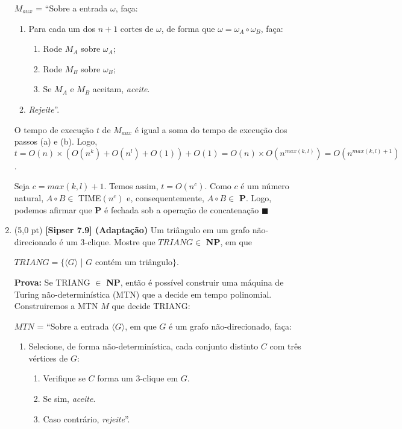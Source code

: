 \documentclass[12pt,a4paper,oneside]{article}
\begin{document}
\begin{enumerate}
{		$M_{aux}$ = ``Sobre a entrada $\omega$, faça:
		\begin{enumerate}
			\item Para cada um dos $n+1$ cortes de $\omega$, de forma que $\omega = \omega_A \circ \omega_B$, faça:
			\begin{enumerate}
				\item Rode $M_A$ sobre $\omega_A$;
				\item Rode $M_B$ sobre $\omega_B$;
				\item Se $M_A$ e $M_B$ aceitam, {\it aceite}.
			\end{enumerate}
			\item {\it Rejeite}''.
		\end{enumerate}
		
		O tempo de execução $t$ de $M_{aux}$ é igual a soma do tempo de execução dos passos (a) e (b). Logo, $t = O(n) \times (O(n^k) + O(n^l) + O(1)) + O(1) = O(n) \times O(n^{max(k,l)}) = O(n^{max(k,l) + 1})$. 
		
		Seja  $c = max(k,l) + 1$. Temos assim, $t = O(n^c)$. Como $c$ é um número natural, $A \circ B \in$ {\sc TIME}$(n^c)$ e, consequentemente, $A \circ B \in$ {\bf P}. Logo, podemos afirmar que {\bf P} é fechada sob a operação de concatenação $\blacksquare$
	}

\newpage

	\item (5,0 pt)  {\bf [Sipser 7.9] (Adaptação)} Um triângulo em um grafo não-direcionado é um 3-clique. Mostre que $TRIANG \in$ {\bf NP}, em que 
	\begin{center}
		$TRIANG = \{ \langle G \rangle$ | $G$ contém um triângulo$\}$.
	\end{center}

	\vspace*{0.3cm}
	
	{ \color{blue}
		{\bf Prova:} Se TRIANG $\in$ {\bf NP}, então é possível construir uma máquina de Turing não-determinística (MTN) que a decide em tempo polinomial. Construiremos a MTN $M$ que decide TRIANG:
		
		$MTN$ = ``Sobre a entrada $\langle G \rangle$, em que $G$ é um grafo não-direcionado, faça:
		\begin{enumerate}
			\item Selecione, de forma não-determinística, cada conjunto distinto $C$ com três vértices de $G$:
			\begin{enumerate}
				\item Verifique se $C$ forma um 3-clique em $G$.
				\item Se sim, {\it aceite}. 
				\item Caso contrário, {\it rejeite}''.
			\end{enumerate}
		\end{enumerate}
		
}
\end{enumerate}
\end{document}
